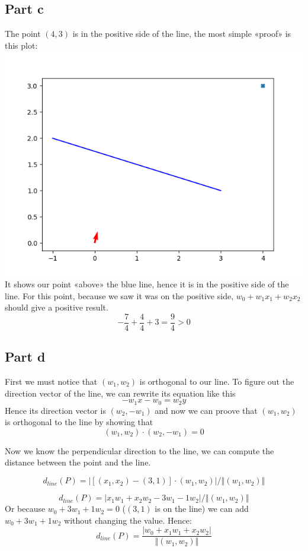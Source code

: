 \documentclass[a4paper, 10pt]{article}
\begin{document}
\subsection{Part c}
The point $(4, 3)$ is in the positive side of the line, the most simple «proof» is this plot:
\\
\includegraphics[scale=0.6]{ex1_partc.png}
\\
It shows our point «above» the blue line, hence it is in the positive side of the line.
For this point, because we saw it was on the positive side, $w_0 + w_1x_1+w_2x_2$ should give a positive result.
$$
-\frac{7}{4}+\frac{4}{4}+3 = \frac{9}{4} > 0
$$

\subsection{Part d}
First we must notice that $(w_1, w_2)$ is orthogonal to our line.
To figure out the direction vector of the line, we can rewrite its equation like this
$$
-w_1x - w_0 = w_2y
$$
Hence its direction vector is $(w_2, -w_1)$ and now we can proove that
$(w_1, w_2)$ is orthogonal to the line by showing that 
$$
(w_1, w_2) \cdot (w_2, -w_1) = 0
$$

Now we know the perpendicular direction to the line, we can compute the distance between the point and the line.



$$
d_{line}(P) = \left\vert [(x_1, x_2) - (3, 1)] \cdot (w_1, w_2) \right\vert / \left\Vert (w_1, w_2) \right\Vert 
$$

$$
d_{line}(P) = \left\vert x_1w_1 + x_2 w_2 - 3w_1 - 1w_2\right\vert / \left\Vert (w_1, w_2) \right\Vert 
$$
Or because $w_0 + 3w_1 + 1w_2 = 0$ ($(3, 1)$ is on the line) we can add $w_0 + 3w_1 + 1w_2$ without changing the value.
Hence:
$$
d_{line}(P) = \frac{\left\vert w_0+x_1w_1+x_2w_2\right\vert}{\left\Vert(w_1, w_2)\right\Vert}
$$
\end{document}
